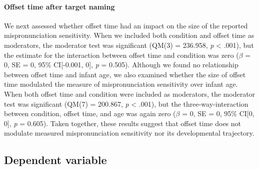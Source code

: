 \documentclass[man]{apa6}
\let\oldparagraph\paragraph
\renewcommand{\paragraph}[1]{\oldparagraph{#1}\mbox{}}
\begin{document}
\hypertarget{offset-time-after-target-naming}{%
\paragraph{Offset time after target naming}\label{offset-time-after-target-naming}}

We next assessed whether offset time had an impact on the size of the reported mispronunciation sensitivity. When we included both condition and offset time as moderators, the moderator test was significant (QM(3) = 236.958, \emph{p} \textless{} .001), but the estimate for the interaction between offset time and condition was zero (\(\beta\) = 0, SE = 0, 95\% CI{[}-0.001, 0{]}, \emph{p} = 0.505). Although we found no relationship between offset time and infant age, we also examined whether the size of offset time modulated the measure of mispronunciation sensitivity over infant age. When both offset time and condition were included as moderators, the moderator test was significant (QM(7) = 200.867, \emph{p} \textless{} .001), but the three-way-interaction between condition, offset time, and age was again zero (\(\beta\) = 0, SE = 0, 95\% CI{[}0, 0{]}, \emph{p} = 0.605). Taken together, these results suggest that offset time does not modulate measured mispronunciation sensitivity nor its developmental trajectory.

\hypertarget{dependent-variable}{%
\subsection{Dependent variable}\label{dependent-variable}}
\end{document}
